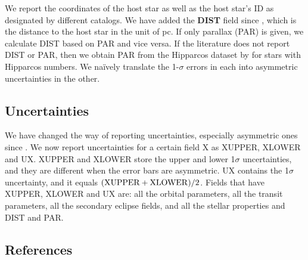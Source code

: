 \documentclass[11pt,preprint]{aastex}
\begin{document}
\begin{CJK*}{UTF8}{gbsn}
We report the coordinates of the host star as well as the host star's
ID as designated by different catalogs.  We have added the {\bf DIST} field since
\cite{Wright2011}, which is the distance to the host star in the unit
of pc. If only parallax (PAR) is given, we calculate DIST based on PAR
and vice versa. If the literature does not report DIST or PAR, then we
obtain PAR from the Hipparcos dataset by \cite{van Leeuwen2009} for
stars with Hipparcos numbers. We na\"ively translate the 1-$\sigma$ errors in each into asymmetric
uncertainties in the other.

\subsection{Uncertainties}\label{sec:unc}

We have changed the way of reporting uncertainties, especially
asymmetric ones since \cite{Wright2011}. We now report
uncertainties for a certain field X as XUPPER, XLOWER and UX. XUPPER
and XLOWER store the upper and lower 1$\sigma$ uncertainties, and they
are different when the error bars are asymmetric. UX contains the
1$\sigma$ uncertainty, and it equals $({\rm XUPPER+XLOWER})/2$. Fields
that have XUPPER, XLOWER and UX are: all the orbital parameters, all
the transit parameters, all the secondary eclipse fields, and all the stellar
properties and DIST and PAR.

\begin{comment}
If only an upper limit is given, we set the parameter field X to 0,
and store the upper limit value in the field XUL. The uncertainty UX
is set to half of the upper limit, and the upper error bar XUPPER to
the upper limit value. For example, if the literature reports the
upper limit for ECC, which we report in ECCUL, then we set ECC to be
0, ECCUPPER to ECCUL, and UECC to ECCUL/2.  We are currently
implementing a more precise upper limit scheme (see
Section~\ref{sec:summary}.)
\end{comment}

\subsection{References}\label{sec:ref}


\end{CJK*}
\end{document}
